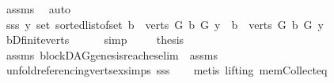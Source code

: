 \begin{isabellebody}
\ assms{\isacharparenleft}{\kern0pt}{}{\isacharparenright}{\kern0pt}\ \isamarkupfalse%
\ auto\isanewline
\ \ \isamarkupfalse%
\ sss{\isacharcolon}{\kern0pt}\ {\isachardoublequoteopen}{\isasymAnd}y{\isachardot}{\kern0pt}\ set\ {\isacharparenleft}{\kern0pt}sorted{\isacharunderscore}{\kern0pt}list{\isacharunderscore}{\kern0pt}of{\isacharunderscore}{\kern0pt}set\ {\isacharbraceleft}{\kern0pt}b\ {\isasymin}\ verts\ G{\isachardot}{\kern0pt}\ b\ {\isasymrightarrow}\isactrlbsub G\isactrlesub \ y{\isacharbraceright}{\kern0pt}{\isacharparenright}{\kern0pt}\ {\isacharequal}{\kern0pt}\ {\isacharbraceleft}{\kern0pt}b\ {\isasymin}\ verts\ G{\isachardot}{\kern0pt}\ b\ {\isasymrightarrow}\isactrlbsub G\isactrlesub \ y{\isacharbraceright}{\kern0pt}\ {\isachardoublequoteclose}\isanewline
\ \ \ \ \isamarkupfalse%
\ bD{\isachardot}{\kern0pt}finite{\isacharunderscore}{\kern0pt}verts\isanewline
\ \ \ \ \isamarkupfalse%
\ simp\ \isanewline
\ \ \isamarkupfalse%
\ {\isacharquery}{\kern0pt}thesis\ \ \isanewline
\ \ \isamarkupfalse%
\ assms\ blockDAG{\isachardot}{\kern0pt}genesis{\isacharunderscore}{\kern0pt}reaches{\isacharunderscore}{\kern0pt}elim\ \ assms\isanewline
\ \ \isamarkupfalse%
\ unfold{\isacharunderscore}{\kern0pt}referencing{\isacharunderscore}{\kern0pt}verts{\isacharunderscore}{\kern0pt}ex{\isachardot}{\kern0pt}simps\ sss\isanewline
\ \ \isamarkupfalse%
\ {\isacharparenleft}{\kern0pt}metis\ {\isacharparenleft}{\kern0pt}lifting{\isacharparenright}{\kern0pt}\ mem{\isacharunderscore}{\kern0pt}Collect{\isacharunderscore}{\kern0pt}eq{\isacharparenright}{\kern0pt}\isanewline
{}\isamarkupfalse%
%
\endisatagproof
{\isafoldproof}%
%
\isadelimproof
\isanewline
%
\endisadelimproof
%
\isadelimtheory
\isanewline
%
\endisadelimtheory
%
\isatagtheory
{}\isamarkupfalse%
%
\endisatagtheory
{\isafoldtheory}%
%
\isadelimtheory
%
\endisadelimtheory
%
\end{isabellebody}%
\endinput
